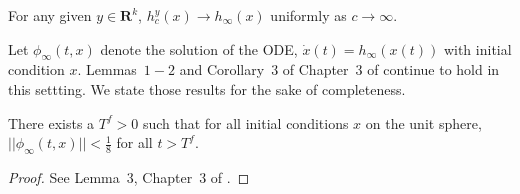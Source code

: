 \begin{corollary}
For any given $y \in \mathbf{R}^k$, $h^y_c(x) \rightarrow h_\infty(x)$ uniformly as $c \rightarrow \infty$.
\end{corollary}
Let $\phi_\infty(t,x)$ denote the solution of the ODE, $\dot{x}(t)=h_\infty(x(t))$ with initial condition $x$.
Lemmas~$1-2$ and Corollary~$3$ of Chapter~$3$ of \cite{SA} continue to hold in this settting. We state those results for the sake of completeness.
\begin{lemma}\label{attract}
There exists a $T^f > 0$ such that for all initial conditions $x$ on the unit sphere, $||\phi_\infty(t,x)|| < \frac{1}{8}$ for all $t > T^f$.
\end{lemma}
\begin{proof}
See Lemma~$3$, Chapter~$3$ of \cite{SA}.
\begin{comment}
Since asymptotic stability implies Liapunov stability, there is a $\delta > 0 $ such that any trajectory starting within distance of $\delta$ of the origin stays within distance $\frac{1}{8}$ thereof. For an inital condition $x$ on the unit sphere, let $T_x$ be a time at which the solution is within distance $\frac{\delta}{2}$ of the origin. Let $x'$ be any other initial condition on the unit sphere. Note that 
\begin{align}
\phi_\infty(t,x) &=x+\overset{t}{\underset{0}{\int}}h_\infty(\phi_\infty(s,x))ds,\mbox{ }\text{and}\nn\\
\phi_\infty(t,x') &=x'+\overset{t}{\underset{0}{\int}}h_\infty(\phi_\infty(s,x'))ds.\nn
\end{align}
Subtracting the above equations and using the Lipschitz property, we get
\begin{align}
||\phi_\infty(t,x)-\phi_\infty(t,x')|| \leq ||x-x'|| + L \overset{t}{\underset{0}{\int}}||\phi_\infty(s,x)-\phi_\infty(s,x')||ds.
\end{align}
Then by Gronwall's inequality section~\ref{gronwall} we find that for $t \leq T_x$,
\begin{align}
||\phi_\infty(t,x)-\phi_\infty(t,x')||\leq ||x-x'||e^{LT_x}.
\end{align}
So there is a neighbourhood $U_x$ of $x$ such that for all $y \in U_x$, $\phi_\infty(T_x,y)$ is within distance of $\delta$ of the origin. By Liapunov stability, this implies that $\phi_\infty(t,x')$ remains within distance of $\frac{1}{8}$ of the origin for all $t\geq T_x$. Since the unit sphere is compact, it can be covered by a finite number of such neighbourhoods $U_{x_1},\ldots,U_{x_n}$ with corresponding times $T_{x_1},\ldots,T_{x_n}$. Then the statement of the lemma holds if $T^f$ is the maximum of $T_{x_1},\ldots,T_{x_n}$.
\end{comment}
\end{proof}\\
